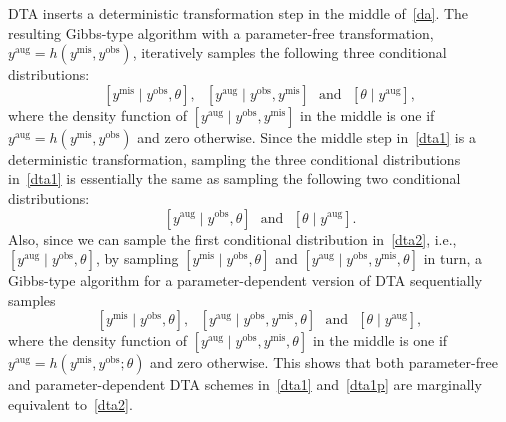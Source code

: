 \documentclass[12pt]{article}
\begin{document}
DTA inserts a deterministic  transformation step in the middle of~\eqref{da}. The resulting Gibbs-type algorithm with a parameter-free transformation, $y^{\textrm{aug}}=h(y^{\textrm{mis}}, y^{\textrm{obs}})$,  iteratively samples the following three conditional distributions:
\begin{equation}\label{dta1}
[y^{\textrm{mis}}\mid y^{\textrm{obs}}, \theta],~~~  [y^{\textrm{aug}}\mid y^{\textrm{obs}}, y^{\textrm{mis}}]~~~\textrm{and}~~~  [\theta\mid y^{\textrm{aug}}],
\end{equation}
where the density function of $[y^{\textrm{aug}}\mid y^{\textrm{obs}}, y^{\textrm{mis}}]$ in the middle is one if $y^{\textrm{aug}}=h(y^{\textrm{mis}}, y^{\textrm{obs}})$ and zero otherwise.   Since the middle step in~\eqref{dta1} is  a deterministic transformation, sampling the three conditional distributions in~\eqref{dta1} is essentially the same as sampling the following two conditional distributions:
\begin{equation}\label{dta2}
[y^{\textrm{aug}}\mid y^{\textrm{obs}}, \theta]~~~\textrm{and}~~~[\theta\mid y^{\textrm{aug}}].  
\end{equation}
Also, since  we can sample the first conditional distribution  in~\eqref{dta2}, i.e., $[y^{\textrm{aug}}\mid y^{\textrm{obs}}, \theta]$, by  sampling $[y^{\textrm{mis}}\mid y^{\textrm{obs}}, \theta]$ and $[y^{\textrm{aug}}\mid y^{\textrm{obs}}, y^{\textrm{mis}}, \theta]$ in turn, a Gibbs-type algorithm for a parameter-dependent version of DTA sequentially samples
\begin{equation}\label{dta1p}
[y^{\textrm{mis}}\mid y^{\textrm{obs}}, \theta],~~~  [y^{\textrm{aug}}\mid y^{\textrm{obs}}, y^{\textrm{mis}}, \theta]~~~\textrm{and}~~~  [\theta\mid y^{\textrm{aug}}],
\end{equation}
where the density function of $[y^{\textrm{aug}}\mid y^{\textrm{obs}}, y^{\textrm{mis}}, \theta]$ in the middle is one if $y^{\textrm{aug}}=h(y^{\textrm{mis}}, y^{\textrm{obs}}; \theta)$ and zero otherwise. This shows that both parameter-free and parameter-dependent  DTA schemes in~\eqref{dta1} and~\eqref{dta1p} are marginally equivalent to~\eqref{dta2}. %
\end{document}
